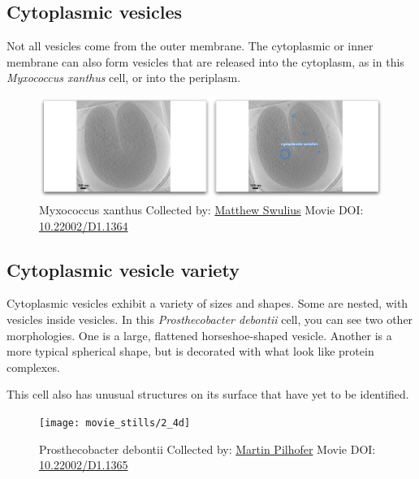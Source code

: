 \documentclass[]{tufte-book}
\begin{document}
\hypertarget{Cytoplasmic_vesicles}{\subsection{Cytoplasmic
vesicles}\label{Cytoplasmic_vesicles}}

Not all vesicles come from the outer membrane. The cytoplasmic or inner
membrane can also form vesicles that are released into the cytoplasm, as
in this \emph{Myxococcus xanthus} cell, or into the periplasm.





\begin{figure}
\includegraphics{movie_stills/2_4c} \caption[Myxococcus xanthus Collected by:
\protect\hyperlink{matthew_swulius}{Matthew Swulius} Movie DOI:
\href{https://doi.org/10.22002/D1.1364}{10.22002/D1.1364}]{Myxococcus xanthus Collected by:
\protect\hyperlink{matthew_swulius}{Matthew Swulius} Movie DOI:
\href{https://doi.org/10.22002/D1.1364}{10.22002/D1.1364}}\label{fig:2-4c}
\end{figure}

\hypertarget{Cytoplasmic_vesicle_variety}{\subsection{Cytoplasmic
vesicle variety}\label{Cytoplasmic_vesicle_variety}}

Cytoplasmic vesicles exhibit a variety of sizes and shapes. Some are
nested, with vesicles inside vesicles. In this \emph{Prosthecobacter
debontii} cell, you can see two other morphologies. One is a large,
flattened horseshoe-shaped vesicle. Another is a more typical spherical
shape, but is decorated with what look like protein complexes.

This cell also has unusual structures on its surface that have yet to be
identified.





\begin{figure}
\texttt{[image: movie\_stills/2\_4d]} \caption[Prosthecobacter debontii Collected by:
\protect\hyperlink{martin_pilhofer}{Martin Pilhofer} Movie DOI:
\href{https://doi.org/10.22002/D1.1365}{10.22002/D1.1365}]{Prosthecobacter debontii Collected by:
\protect\hyperlink{martin_pilhofer}{Martin Pilhofer} Movie DOI:
\href{https://doi.org/10.22002/D1.1365}{10.22002/D1.1365}}\label{fig:2-4d}
\end{figure}
\end{document}
